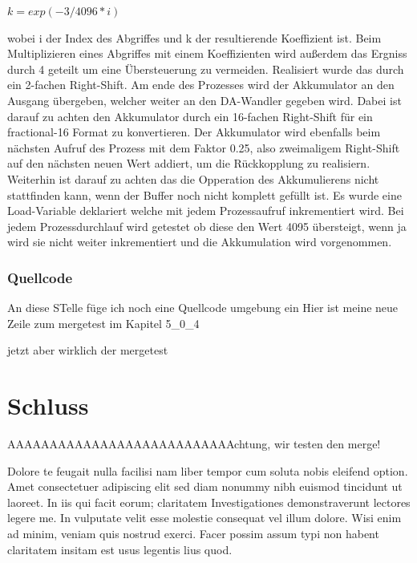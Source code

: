 \documentclass[a4paper,12pt,fontsize=12,DIV=12]{scrartcl}
\begin{document}
$k=exp(-3/4096*i)$
 
wobei i der Index des Abgriffes und k der resultierende Koeffizient ist.
Beim Multiplizieren eines Abgriffes mit einem Koeffizienten wird außerdem das Ergniss durch 4 geteilt um eine Übersteuerung zu vermeiden. Realisiert wurde das durch ein 2-fachen Right-Shift.
Am ende des Prozesses wird der Akkumulator an den Ausgang übergeben, welcher weiter an den DA-Wandler gegeben wird. Dabei ist darauf zu achten den Akkumulator durch ein 16-fachen Right-Shift für ein fractional-16 Format zu konvertieren.
Der Akkumulator wird ebenfalls beim nächsten Aufruf des Prozess mit dem Faktor 0.25, also zweimaligem Right-Shift auf den nächsten neuen Wert addiert, um die Rückkopplung zu realisiern.
Weiterhin ist darauf zu achten das die Opperation des Akkumulierens nicht stattfinden kann, wenn der Buffer noch nicht komplett gefüllt ist. Es wurde eine Load-Variable deklariert welche mit jedem Prozessaufruf inkrementiert wird. Bei jedem Prozessdurchlauf wird getestet ob diese den Wert 4095 übersteigt, wenn ja wird sie nicht weiter inkrementiert und die Akkumulation wird vorgenommen.

\subsubsection{Quellcode}
An diese STelle füge ich noch eine Quellcode umgebung ein
Hier ist meine neue Zeile zum mergetest im Kapitel 5\_0\_4

jetzt aber wirklich der mergetest




\section{Schluss}
AAAAAAAAAAAAAAAAAAAAAAAAAAAchtung, wir testen den merge!


Dolore te feugait nulla facilisi nam liber tempor cum soluta nobis eleifend option. Amet consectetuer adipiscing elit sed diam nonummy nibh euismod tincidunt ut laoreet. In iis qui facit eorum; claritatem Investigationes demonstraverunt lectores legere me. In vulputate velit esse molestie consequat vel illum dolore. Wisi enim ad minim, veniam quis nostrud exerci. Facer possim assum typi non habent claritatem insitam est usus legentis lius quod.
\end{document}
